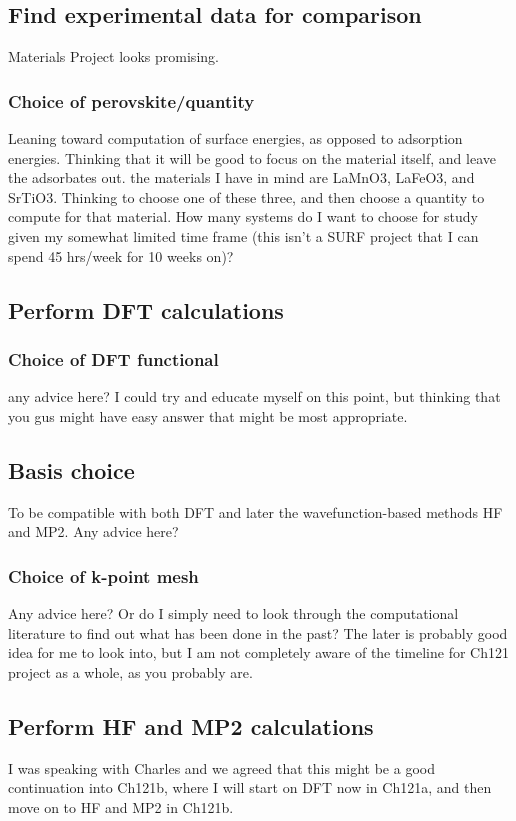 \documentclass[12pt]{article}
\begin{document}
\subsection{Find experimental data for comparison}
Materials Project looks promising.
\subsubsection{Choice of perovskite/quantity}
Leaning toward computation of surface energies, as opposed to adsorption energies. Thinking that it will be good to focus on the material itself, and leave the adsorbates out.  the materials I have in mind are LaMnO3, LaFeO3, and SrTiO3. Thinking to choose one of these three, and then choose a quantity to compute for that material. How many systems do I want to choose for study given my somewhat limited time frame (this isn't a SURF project that I can spend 45 hrs/week for 10 weeks on)?
\subsection{Perform DFT calculations}
\subsubsection{Choice of DFT functional}
any advice here? I could try and educate myself on this point, but thinking that you gus might have easy answer that might be most appropriate.
\subsection{Basis choice}
To be compatible with both DFT and later the wavefunction-based methods HF and MP2. Any advice here?
\subsubsection{Choice of k-point mesh}
Any advice here? Or do I simply need to look through the computational literature to find out what has been done in the past? The later is probably good idea for me to look into, but I am not completely aware of the timeline for Ch121 project as a whole, as you probably are.
\subsection{Perform HF and MP2 calculations}
I was speaking with Charles and we agreed that this might be a good continuation into Ch121b, where I will start on DFT now in Ch121a, and then move on to HF and MP2 in Ch121b.


\end{document}
